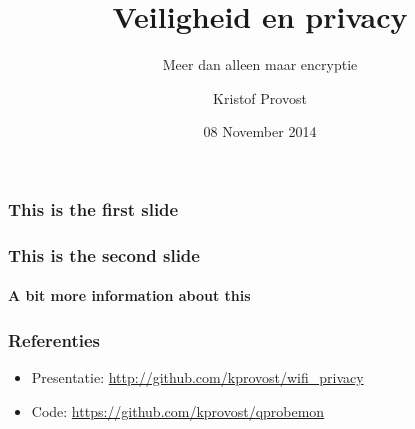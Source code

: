 \documentclass{beamer}
\title{Veiligheid en privacy}
\subtitle{Meer dan alleen maar encryptie}
\author{Kristof Provost}
\date{08 November 2014}
\begin{document}
  \frame{\titlepage}

  \begin{frame}
    \frametitle{This is the first slide}
  \end{frame}

  \begin{frame}
    \frametitle{This is the second slide}
    \framesubtitle{A bit more information about this}
  \end{frame}

  \begin{frame}
    \frametitle{Referenties}
    \begin{itemize}
        \item Presentatie: \url{http://github.com/kprovost/wifi_privacy}
        \item Code: \url{https://github.com/kprovost/qprobemon}
    \end{itemize}
  \end{frame}
\end{document}
